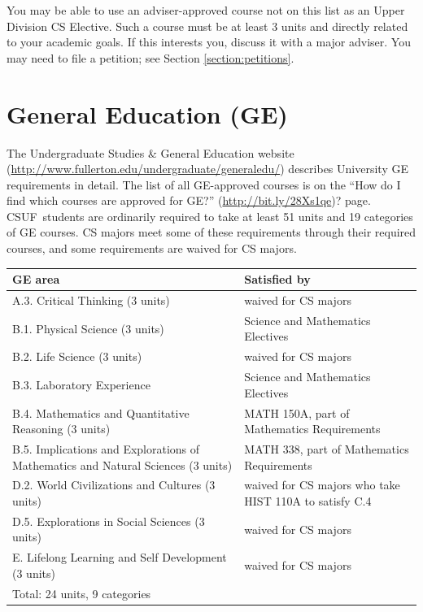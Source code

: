 \documentclass{book}
\newcommand{\CampusName}{CSUF}
\begin{document}
You may be able to use an adviser-approved course not on this list as an Upper Division CS Elective. Such a course must be at least 3 units and directly related to your academic goals. If this interests you, discuss it with a major adviser. You may need to file a petition; see Section \ref{section:petitions}.

\section{General Education (GE)}

\newcommand{\gecourselist}{ ``How do I find which courses are approved for GE?'' (\url{http://bit.ly/28Xs1qe})? }

The Undergraduate Studies \& General Education website (\url{http://www.fullerton.edu/undergraduate/generaledu/}) describes University GE requirements in detail. The list of all GE-approved courses is on the \gecourselist page. \CampusName~students are ordinarily required to take at least 51 units and 19 categories of GE courses. CS majors meet some of these requirements through their required courses, and some requirements are waived for CS majors.

\begin{center}
\begin{tabular}{| p{3in} | p{3in} |} \hline
  \textbf{GE area} & \textbf{Satisfied by} \\ \hline
  A.3. Critical Thinking (3 units) & waived for CS majors \\ \hline
  B.1. Physical Science (3 units) & Science and Mathematics Electives \\ \hline
  B.2. Life Science (3 units) & waived for CS majors \\ \hline
  B.3. Laboratory Experience & Science and Mathematics Electives \\ \hline
  B.4. Mathematics and Quantitative Reasoning (3 units) & MATH 150A, part of Mathematics Requirements \\ \hline
  B.5. Implications and Explorations of Mathematics and Natural Sciences (3 units) & MATH 338, part of Mathematics Requirements \\ \hline
  D.2. World Civilizations and Cultures (3 units) & waived for CS majors who take HIST 110A to satisfy C.4 \\ \hline
  D.5. Explorations in Social Sciences (3 units) & waived for CS majors \\ \hline
  E. Lifelong Learning and Self Development (3 units) & waived for CS majors \\ \hline
  \multicolumn{2}{|l|}{Total: 24 units, 9 categories} \\ \hline
\end{tabular}
\end{center}
\end{document}
